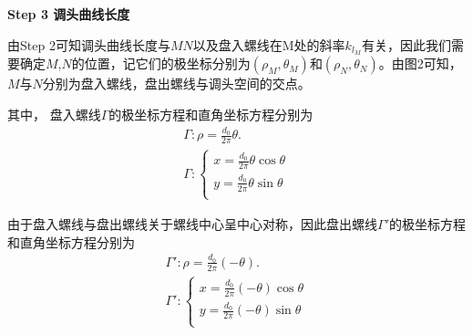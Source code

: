\documentclass[../main.tex]{subfiles}
\begin{document}
\noindent\textbf{Step 3 调头曲线长度} 
\par 由Step 2可知调头曲线长度与$MN$以及盘入螺线在M处的斜率$k_{l_M}$有关，因此我们需要确定$M$,$N$的位置，记它们的极坐标分别为$(\rho_M,\theta_M)$和$(\rho_N,\theta_N)$。由图2可知，$M$与$N$分别为盘入螺线，盘出螺线与调头空间的交点。
\par 其中， 盘入螺线\(\varGamma\)的极坐标方程和直角坐标方程分别为
\begin{gather}
\varGamma :\rho =\frac{d_0}{2\pi}\theta.\label{7.3.1}
\\
\varGamma :\begin{cases}\label{7.4.1}
x=\frac{d_0}{2\pi}\theta \cos \theta\\
y=\frac{d_0}{2\pi}\theta \sin \theta\\
\end{cases}
\end{gather}

\par 由于盘入螺线与盘出螺线关于螺线中心呈中心对称，因此盘出螺线$\varGamma'$的极坐标方程和直角坐标方程分别为
\begin{gather}
\varGamma':\rho =\frac{d_0}{2\pi}\left( -\theta \right) .\label{7.3.2}  \\
\varGamma':\begin{cases}\label{7.4.2}
x=\frac{d_0}{2\pi}\left( -\theta \right) \cos \theta\\
y=\frac{d_0}{2\pi}\left( -\theta \right) \sin \theta\\
\end{cases}
\end{gather}
\end{document}
